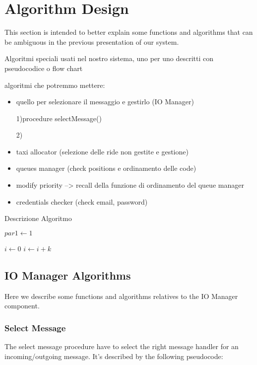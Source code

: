 \documentclass[../../dd.tex]{subfiles}
\begin{document}
	\chapter{Algorithm Design}
		This section is intended to better explain some functions and algorithms that can be ambiguous in the previous presentation of our system.


		Algoritmi speciali usati nel nostro sistema, uno per uno descritti con pseudocodice o flow chart

		algoritmi che potremmo mettere:
		\begin{itemize}
				\item quello per selezionare il messaggio e gestirlo (IO Manager)

					1)procedure selectMessage()
						
					2)
				\item taxi allocator (selezione delle ride non gestite e gestione)
				\item queues manager (check positions e ordinamento delle code)
				\item modify priority --> recall della funzione di ordinamento del queue manager
				\item credentials checker (check email, password)
		\end{itemize}

		\begin{algorithm}
			\caption{Descrizione Algoritmo}\label{alg:descrizioneAlgoritmo}
			\begin{algorithmic}[1]
				\State $par1\gets 1$

				    \State $i\gets 0$
				\Else
				        \State $i\gets i+k$
				    \EndIf
				\EndIf
			\EndProcedure
			\end{algorithmic}
		\end{algorithm}

		\section{IO Manager Algorithms}
			Here we describe some functions and algorithms relatives to the IO Manager component.
			\subsection{Select Message}
				The select message procedure have to select the right message handler for an incoming/outgoing message.
				It's described by the following pseudocode:
\end{document}
